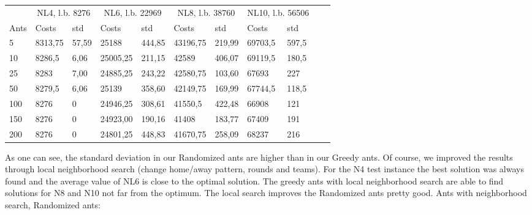 \begin{minipage}[b]{1.0\textwidth}
    \begin{tabular}{ l | ll | ll | ll | ll | ll}
	\hline
	& \multicolumn{2}{c}{NL4, l.b. 8276} & \multicolumn{2}{c}{NL6, l.b. 22969}
	& \multicolumn{2}{c}{NL8, l.b. 38760} & \multicolumn{2}{c}{NL10, l.b. 56506} \\
	\cline{1-9}
	Ants & Costs & std & Costs & std & Costs & std & Costs & std \\
	\hline
	5   &  8313,75  & 57,59 &  25188    & 444,85 &  43196,75  & 219,99 &  69703,5  & 597,5 \\
	10  &  8286,5   & 6,06 &  25005,25  & 211,15 &  42589     & 406,07 &  69119,5  & 180,5 \\
	25  &  8283    & 7,00 &  24885,25   & 243,22 &  42580,75  & 103,60 &  67693 	& 227 \\
	50  &  8279,5  & 6,06 &  25139    & 358,60 &  42149,75   & 169,99 &  67744,5    & 118,5 \\
	100 &  8276    & 0 &  24946,25    & 308,61 &  41550,5    & 422,48 &  66908    & 121 \\
	150 &  8276    & 0 &  24923,00    & 190,16 &  41408      & 183,77 &  67409    &
	191 \\ 200 &  8276    & 0 &  24801,25    & 448,83 &  41670,75   & 258,09 &  68237    & 216 \\
	\hline
	\end{tabular}
\end{minipage}
\newline
As one can see, the standard deviation in our Randomized ants are higher than in
our Greedy ants.
\newline
Of course, we improved the results through local neighborhood search
(change home/away pattern, rounds and teams). For the N4 test instance the best
solution was always found and the average value of NL6 is close to the optimal solution. The greedy ants with local neighborhood search are able to find solutions for N8 and N10 not far from the optimum.
The local search improves the Randomized ants pretty good.
\newline
Ants with neighborhood search, Randomized ants:
\newline
